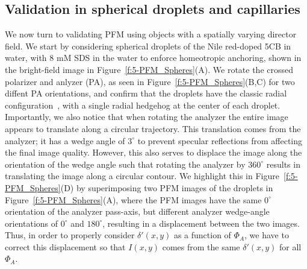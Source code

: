 \subsection{Validation in spherical droplets and capillaries}
We now turn to validating PFM using objects with a spatially varying director field.
We start by considering spherical droplets of the Nile red-doped 5CB in water, with 8 mM SDS in the water to enforce homeotropic anchoring, shown in the bright-field image in Figure~\ref{f:5-PFM_Spheres}(A).
We rotate the crossed polarizer and anlyzer (PA), as seen in Figure~\ref{f:5-PFM_Spheres}(B,C) for two diffent PA orientations, and confirm that the droplets have the classic radial configuration~\cite{RN177}, with a single radial hedgehog at the center of each droplet.
Importantly, we also notice that when rotating the analyzer the entire image appears to translate along a circular trajectory.
This translation comes from the analyzer; it has a wedge angle of $3^{\circ}$ to prevent specular reflections from affecting the final image quality.
However, this also serves to displace the image along the orientation of the wedge angle such that rotating the analyzer by $360^{\circ}$ results in translating the image along a circular contour.
We highlight this in Figure~\ref{f:5-PFM_Spheres}(D) by superimposing two PFM images of the droplets in Figure~\ref{f:5-PFM_Spheres}(A), where the PFM images have the same $0^{\circ}$ orientation of the analyzer pass-axis, but different analyzer wedge-angle orientations of $0^{\circ}$ and $180^{\circ}$, resulting in a displacement between the two images.
Thus, in order to properly consider $\delta'(x,y)$ as a function of $\Phi_A$, we have to correct this displacement so that $I(x,y)$ comes from the same $\delta'(x,y)$ for all $\Phi_A$.
